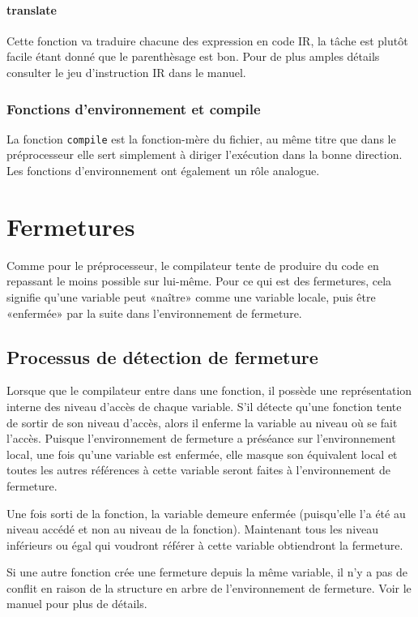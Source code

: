 \documentclass{article}
\begin{document}
\paragraph{translate}
Cette fonction va traduire chacune des expression en code IR, la tâche est plutôt facile étant donné que le parenthèsage est bon. Pour de plus amples détails consulter le jeu d'instruction IR dans le manuel.

\subsubsection{Fonctions d'environnement et compile}
La fonction \texttt{compile} est la fonction-mère du fichier, au même titre que dans le préprocesseur elle sert simplement à diriger l'exécution dans la bonne direction. Les fonctions d'environnement ont également un rôle analogue.

\section{Fermetures}
Comme pour le préprocesseur, le compilateur tente de produire du code en repassant le moins possible sur lui-même. Pour ce qui est des fermetures, cela signifie qu'une variable peut «naître» comme une variable locale, puis être «enfermée» par la suite dans l'environnement de fermeture.

\subsection{Processus de détection de fermeture}
Lorsque que le compilateur entre dans une fonction, il possède une représentation interne des niveau d'accès de chaque variable. S'il détecte qu'une fonction tente de sortir de son niveau d'accès, alors il enferme la variable au niveau où se fait l'accès. Puisque l'environnement de fermeture a préséance sur l'environnement local, une fois qu'une variable est enfermée, elle masque son équivalent local et toutes les autres références à cette variable seront faites à l'environnement de fermeture.

Une fois sorti de la fonction, la variable demeure enfermée (puisqu'elle l'a été au niveau accédé et non au niveau de la fonction). Maintenant tous les niveau inférieurs ou égal qui voudront référer à cette variable obtiendront la fermeture.

Si une autre fonction crée une fermeture depuis la même variable, il n'y a pas de conflit en raison de la structure en arbre de l'environnement de fermeture. Voir le manuel pour plus de détails.
\end{document}
